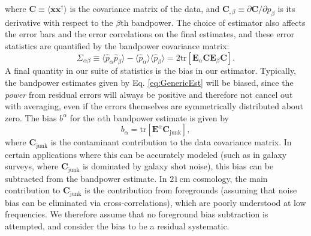 \documentclass[twocolumn,aps,prd,nofootinbib,showpacs]{revtex4-1}
\begin{document}
where $\mathbf{C} \equiv \langle \mathbf{x} \mathbf{x}^\dagger \rangle$ is the covariance matrix of the data, and $\mathbf{C}_{,\beta} \equiv \partial \mathbf{C} / \partial p_\beta$ is its derivative with respect to the $\beta$th bandpower.  The choice of estimator also affects the error bars and the error correlations on the final estimates, and these error statistics are quantified by the bandpower covariance matrix:
\begin{equation}
\Sigma_{\alpha \beta} \equiv \langle \widehat{p}_\alpha \widehat{p}_\beta \rangle - \langle \widehat{p}_\alpha \rangle \langle \widehat{p}_\beta \rangle = 2 \textrm{tr} \left[ \mathbf{E}_\alpha \mathbf{C} \mathbf{E}_\beta \mathbf{C} \right].
\end{equation}
A final quantity in our suite of statistics is the bias in our estimator.  Typically, the bandpower estimates given by Eq. \eqref{eq:GenericEst} will be biased, since the \emph{power} from residual errors will always be positive and therefore not cancel out with averaging, even if the errors themselves are symmetrically distributed about zero.  The bias $b^\alpha$ for the $\alpha$th bandpower estimate is given by
\begin{equation}
\label{eq:bias}
b_\alpha = \textrm{tr}  [\mathbf{E}^\alpha \mathbf{C}_\textrm{junk}],
\end{equation}
where $\mathbf{C}_\textrm{junk}$ is the contaminant contribution to the data covariance matrix.  In certain applications where this can be accurately modeled (such as in galaxy surveys, where $\mathbf{C}_\textrm{junk}$ is dominated by galaxy shot noise), this bias can be subtracted from the bandpower estimate.  In $21\,\textrm{cm}$ cosmology, the main contribution to $\mathbf{C}_\textrm{junk}$ is the contribution from foregrounds (assuming that noise bias can be eliminated via cross-correlations), which are poorly understood at low frequencies.  We therefore assume that no foreground bias subtraction is attempted, and consider the bias to be a residual systematic.
\end{document}
